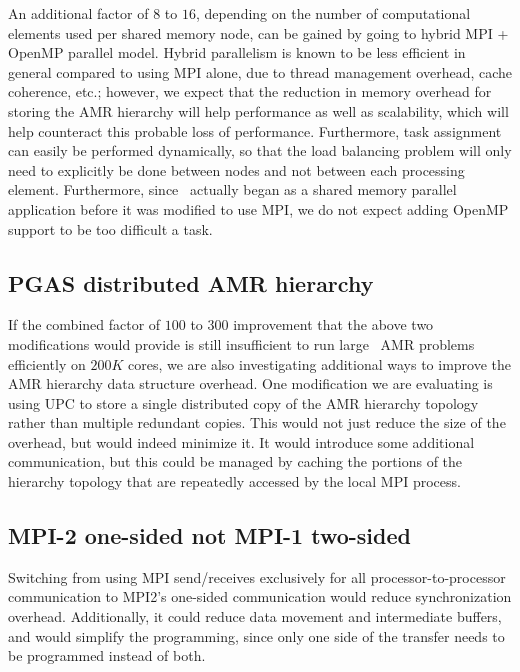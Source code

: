\documentclass{article}
\begin{document}
  An additional factor of $8$ to $16$, depending on the number of
  computational elements used per shared memory node, can be gained by
  going to hybrid MPI + OpenMP parallel model.  Hybrid parallelism is
  known to be less efficient in general compared to using MPI alone,
  due to thread management overhead, cache coherence, etc.; however,
  we expect that the reduction in memory overhead for storing the AMR
  hierarchy will help performance as well as scalability, which will
  help counteract this probable loss of performance.  Furthermore,
  task assignment can easily be performed dynamically, so that the
  load balancing problem will only need to explicitly be done between
  nodes and not between each processing element.  Furthermore, since
  \enzo\ actually began as a shared memory parallel application before
  it was modified to use MPI, we do not expect adding OpenMP support
  to be too difficult a task. %

\subsection{PGAS distributed AMR hierarchy} \label{solution:parallel-pgas}

 If the combined factor of $100$ to $300$ improvement that the above
 two modifications would provide is still insufficient to run large \enzo\
 AMR problems efficiently on $200K$ cores, we are also investigating
 additional ways to improve the AMR hierarchy data structure overhead.
 One modification we are evaluating is using UPC to store a single
 distributed copy of the AMR hierarchy topology rather than multiple
 redundant copies.  This would not just reduce the size of the
 overhead, but would indeed minimize it.  It would introduce some
 additional communication, but this could be managed by caching the
 portions of the hierarchy topology that are repeatedly accessed by
 the local MPI process.  

\subsection{MPI-2 one-sided not MPI-1 two-sided}  \label{solution:parallel-onesided}

  Switching from using MPI send/receives exclusively for all
  processor-to-processor communication to MPI2's one-sided
  communication would reduce synchronization overhead.  Additionally,
  it could reduce data movement and intermediate buffers, and would
  simplify the programming, since only one side of the transfer needs
  to be programmed instead of both.
\end{document}
